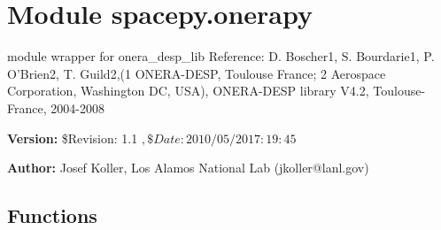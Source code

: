 %
%
%


\section{Module spacepy.onerapy}

    \label{spacepy:onerapy}
module wrapper for onera\_desp\_lib Reference: D. Boscher1, S. Bourdarie1, 
P. O'Brien2, T. Guild2,(1 ONERA-DESP, Toulouse France; 2 Aerospace 
Corporation, Washington DC, USA), ONERA-DESP library V4.2, Toulouse-France,
2004-2008

\textbf{Version:} \$Revision: 1.1 $, \$Date: 2010/05/20 17:19:45 $



\textbf{Author:} Josef Koller, Los Alamos National Lab (jkoller@lanl.gov)





  \subsection{Functions}

    \label{spacepy:onerapy:get_Bfield}

    \vspace{0.5ex}

